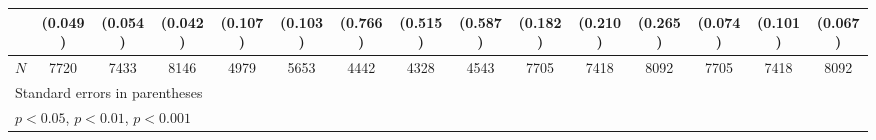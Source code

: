 {\begin{tabular}{l*{14}{c}}
            &     (0.049)         &     (0.054)         &     (0.042)         &     (0.107)         &     (0.103)         &     (0.766)         &     (0.515)         &     (0.587)         &     (0.182)         &     (0.210)         &     (0.265)         &     (0.074)         &     (0.101)         &     (0.067)         \\
\hline
\(N\)       &        7720         &        7433         &        8146         &        4979         &        5653         &        4442         &        4328         &        4543         &        7705         &        7418         &        8092         &        7705         &        7418         &        8092         \\
\hline\hline
\multicolumn{15}{l}{\footnotesize Standard errors in parentheses}\\
\multicolumn{15}{l}{\footnotesize \sym{*} \(p<0.05\), \sym{**} \(p<0.01\), \sym{***} \(p<0.001\)}\\
\end{tabular}
}

